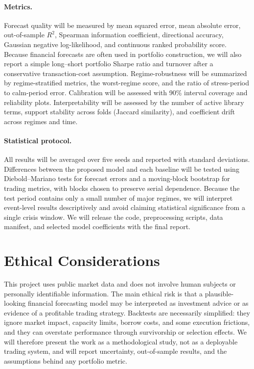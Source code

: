 \documentclass{article}
\begin{document}
\paragraph{Metrics.}
Forecast quality will be measured by mean squared error, mean absolute error, out-of-sample $R^2$, Spearman information coefficient, directional accuracy, Gaussian negative log-likelihood, and continuous ranked probability score. Because financial forecasts are often used in portfolio construction, we will also report a simple long--short portfolio Sharpe ratio and turnover after a conservative transaction-cost assumption. Regime-robustness will be summarized by regime-stratified metrics, the worst-regime score, and the ratio of stress-period to calm-period error. Calibration will be assessed with 90\% interval coverage and reliability plots. Interpretability will be assessed by the number of active library terms, support stability across folds (Jaccard similarity), and coefficient drift across regimes and time.

\paragraph{Statistical protocol.}
All results will be averaged over five seeds and reported with standard deviations. Differences between the proposed model and each baseline will be tested using Diebold--Mariano tests for forecast errors and a moving-block bootstrap for trading metrics, with blocks chosen to preserve serial dependence. Because the test period contains only a small number of major regimes, we will interpret event-level results descriptively and avoid claiming statistical significance from a single crisis window. We will release the code, preprocessing scripts, data manifest, and selected model coefficients with the final report.

\section{Ethical Considerations}

This project uses public market data and does not involve human subjects or personally identifiable information. The main ethical risk is that a plausible-looking financial forecasting model may be interpreted as investment advice or as evidence of a profitable trading strategy. Backtests are necessarily simplified: they ignore market impact, capacity limits, borrow costs, and some execution frictions, and they can overstate performance through survivorship or selection effects. We will therefore present the work as a methodological study, not as a deployable trading system, and will report uncertainty, out-of-sample results, and the assumptions behind any portfolio metric.
\end{document}
